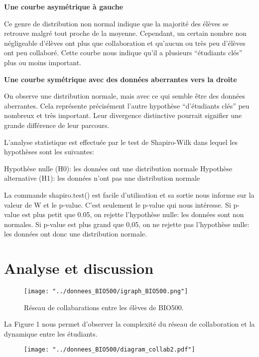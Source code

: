 \documentclass[9pt,twocolumn,twoside,]{pnas-new}
\begin{document}
\textbf{Une courbe asymétrique à gauche}

Ce genre de distribution non normal indique que la majorité des élèves
se retrouve malgré tout proche de la moyenne. Cependant, un certain
nombre non négligeable d'élèves ont plus que collaboration et qu'aucun
ou très peu d'élèves ont peu collaboré. Cette courbe nous indique qu'il
a plusieurs ``étudiants clés'' plus ou moins important.

\textbf{Une courbe symétrique avec des données aberrantes vers la
droite}

On observe une distribution normale, mais avec ce qui semble être des
données aberrantes. Cela représente précisément l'autre hypothèse
``d'étudiants clés'' peu nombreux et très important. Leur divergence
distinctive pourrait signifier une grande différence de leur parcours.

L'analyse statistique est effectuée par le test de Shapiro-Wilk dans
lequel les hypothèses sont les suivantes:

Hypothèse nulle (H0): les données ont une distribution normale Hypothèse
alternative (H1): les données n'ont pas une distribution normale

La commande shapiro.test() est facile d'utilisation et sa sortie nous
informe sur la valeur de W et le p-value. C'est seulement le p-value qui
nous intéresse. Si p-value est plus petit que 0.05, on rejette
l'hypothèse nulle: les données sont non normales. Si p-value est plus
grand que 0,05, on ne rejette pas l'hypothèse nulle: les données ont
donc une distribution normale.

\hypertarget{analyse-et-discussion}{%
\section{Analyse et discussion}\label{analyse-et-discussion}}

\begin{figure}
\centering
\texttt{[image: "../donnees\_BIO500/igraph\_BIO500.png"]}
\caption{Réseau de collabarations entre les élèves de BIO500.
\label{fig:plot1}}
\end{figure}

La Figure 1 nous permet d'observer la complexité du réseau de
collaboration et la dynamique entre les étudiants.

\begin{figure}
\centering
\texttt{[image: "../donnees\_BIO500/diagram\_collab2.pdf"]}
\caption{\label{fig:plot2}}
\end{figure}
\end{document}
